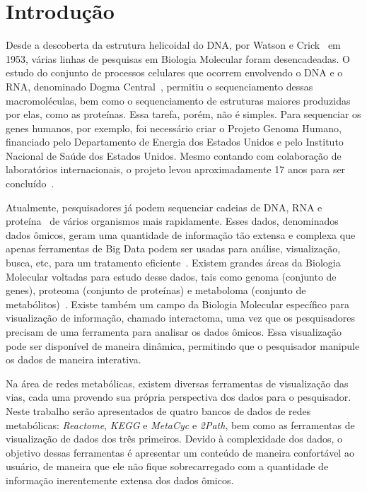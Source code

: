\chapter{Introdução}

\indent Desde a descoberta da estrutura helicoidal do DNA, por Watson e Crick~\cite{setubal97} em 1953, várias linhas de pesquisas em Biologia Molecular foram desencadeadas. O estudo do conjunto de processos celulares que ocorrem envolvendo o DNA e o RNA, denominado Dogma Central~\cite{setubal97}, permitiu o sequenciamento dessas macromoléculas, bem como o sequenciamento de estruturas maiores produzidas por elas, como as proteínas. Essa tarefa, porém, não é simples. Para sequenciar os genes humanos, por exemplo, foi necessário criar o Projeto Genoma Humano, financiado pelo Departamento de Energia dos Estados Unidos e pelo Instituto Nacional de Saúde dos Estados Unidos. Mesmo contando com colaboração de laboratórios internacionais, o projeto levou aproximadamente 17 anos para ser concluído~\cite{mount01}.

\indent Atualmente, pesquisadores já podem sequenciar cadeias de DNA, RNA e proteína~\cite{mount01} de vários organismos mais rapidamente. Esses dados, denominados dados ômicos, geram uma quantidade de informação tão extensa e complexa que apenas ferramentas de Big Data podem ser usadas para análise, visualização, busca, etc, para um tratamento eficiente~\cite{berger13}. Existem grandes áreas da Biologia Molecular voltadas para estudo desse dados, tais como genoma (conjunto de genes), proteoma (conjunto de proteínas) e metaboloma (conjunto de metabólitos)~\cite{berger13}. Existe também um campo da Biologia Molecular específico para visualização de informação, chamado interactoma, uma vez que os pesquisadores precisam de uma ferramenta para analisar os dados ômicos. Essa visualização pode ser disponível de maneira dinâmica, permitindo que o pesquisador manipule os dados de maneira interativa. 

\indent Na área de redes metabólicas, existem diversas ferramentas de visualização das vias, cada uma provendo sua própria perspectiva dos dados para o pesquisador. Neste trabalho serão apresentados de quatro bancos de dados de redes metabólicas: \textit{Reactome}, \textit{KEGG} e \textit{MetaCyc} e \textit{2Path}, bem como as ferramentas de visualização de dados dos três primeiros. Devido à complexidade dos dados, o objetivo dessas ferramentas é apresentar um conteúdo de maneira confortável ao usuário, de maneira que ele não fique sobrecarregado com a quantidade de informação inerentemente extensa dos dados ômicos.

